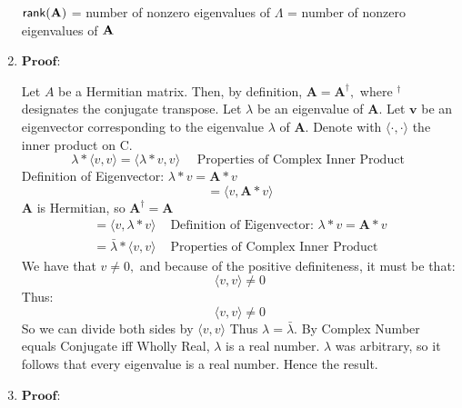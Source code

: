 \documentclass[english,onecolumn]{IEEEtran}
\begin{document}
\begin{enumerate}
    
    ${\sf rank}({\bf A})$ = number of nonzero eigenvalues of ${\Lambda}$ = number of nonzero eigenvalues of ${\bf A}$
    \item $\textbf{Proof}$: 
    
    Let $A$ be a Hermitian matrix.
    Then, by definition, $\mathbf{A}=\mathbf{A}^{\dagger},$ where $^{\dagger}$ designates the conjugate transpose.
    Let $\lambda$ be an eigenvalue of $\mathbf{A}$.
    Let $\mathbf{v}$ be an eigenvector corresponding to the eigenvalue $\lambda$ of $\mathbf{A}$.
    Denote with $\langle\cdot, \cdot\rangle$ the inner product on $\mathrm{C}$.
    $$
    \lambda *\langle v, v\rangle=\langle\lambda * v, v\rangle \quad \text { Properties of Complex Inner Product }
    $$
    Definition of Eigenvector: $\lambda * v=\mathbf{A} * v$
    $$
    =\langle v, \mathbf{A} * v\rangle
    $$
    $\mathbf{A}$ is Hermitian, so $\mathbf{A}^{\dagger}=\mathbf{A}$
    $$
    \begin{array}{ll}
    	=\langle v, \lambda * v\rangle & \text { Definition of Eigenvector: } \lambda * v=\mathbf{A} * v \\
    	=\bar{\lambda} *\langle v, v\rangle & \text { Properties of Complex Inner Product }
    \end{array}
    $$
    We have that $v \neq 0,$ and because of the positive definiteness, it must be that:
    $$
    \langle v, v\rangle \neq 0
    $$
    Thus:
    $$
    \langle v, v\rangle \neq 0
    $$
    So we can divide both sides by $\langle v, v\rangle$
    Thus $\lambda=\bar{\lambda}$.
    By Complex Number equals Conjugate iff Wholly Real, $\lambda$ is a real number.
    $\lambda$ was arbitrary, so it follows that every eigenvalue is a real number.
    Hence the result.
    \item $\textbf{Proof}$: 
    

\end{enumerate}
\end{document}
